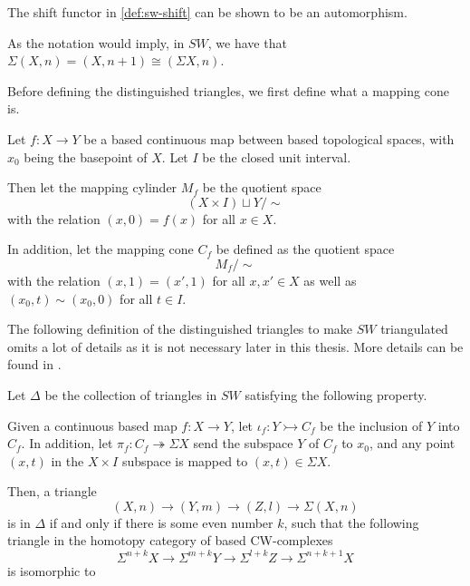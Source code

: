 The shift functor in \autoref{def:sw-shift} can be shown to be an automorphism.

As the notation would imply, in \( SW \), we have that \( \Sigma(X, n) = (X, n + 1) \cong ( \Sigma X, n ) \).

Before defining the distinguished triangles, we first define what a mapping cone is.
\begin{definition}
    Let \( f: X \to Y \) be a based continuous map between based topological spaces, with \( x_0 \) being the basepoint of \( X \). Let \( I \) be the closed unit interval.

    Then let the mapping cylinder \( M_f \) be the quotient space
    \[
        (X \times I) \sqcup Y / \sim
    \]
    with the relation \( (x, 0) = f(x) \) for all \( x \in X \).

    In addition, let the mapping cone \( C_f \) be defined as the quotient space
    \[
        M_f / \sim
    \]
    with the relation \( (x, 1) = (x', 1) \) for all \( x, x' \in X \) as well as \( (x_0, t) \sim (x_0, 0) \) for all \( t \in I \).
\end{definition}

The following definition of the distinguished triangles to make \( SW \) triangulated omits a lot of details as it is not necessary later in this thesis. More details can be found in \cite[Definition 5.8, Definition 4.7]{Daria_Bachelor}.

\begin{definition}
    \label{def:sw-dist_triangles}
    Let \( \Delta \) be the collection of triangles in \( SW \) satisfying the following property.

    Given a continuous based map \( f: X \to Y \), let \( \iota_f: Y \rightarrowtail C_f \) be the inclusion of \( Y \) into \( C_f \). In addition, let \( \pi_f: C_f \twoheadrightarrow \Sigma X \) send the subspace \( Y \) of \( C_f \) to \( x_0 \), and any point \( (x, t) \) in the \( X \times I \) subspace is mapped to \( (x, t) \in \Sigma X \).
    
    Then, a triangle
    \[
        (X, n) \to (Y, m) \to (Z, l) \to \Sigma (X, n)
    \]
    is in \( \Delta \) if and only if there is some even number \( k \), such that the following triangle in the homotopy category of based CW-complexes
    \[
        \Sigma^{n + k} X \to \Sigma^{m + k} Y \to \Sigma^{l + k} Z \to \Sigma^{n + k + 1} X
    \]
    is isomorphic to
    \begin{center}
    \end{center}
    
\end{definition}

